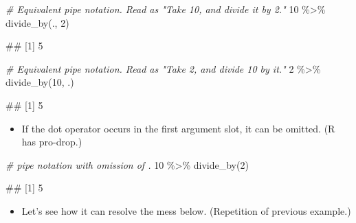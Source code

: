 \documentclass[
]{book}
\newenvironment{Shaded}{\begin{snugshade}}{\end{snugshade}}
\newcommand{\CommentTok}[1]{\textcolor[rgb]{0.56,0.35,0.01}{\textit{#1}}}
\newcommand{\DecValTok}[1]{\textcolor[rgb]{0.00,0.00,0.81}{#1}}
\newcommand{\FunctionTok}[1]{\textcolor[rgb]{0.00,0.00,0.00}{#1}}
\newcommand{\NormalTok}[1]{#1}
\newcommand{\SpecialCharTok}[1]{\textcolor[rgb]{0.00,0.00,0.00}{#1}}
\providecommand{\tightlist}{%
  \setlength{\itemsep}{0pt}\setlength{\parskip}{0pt}}
\begin{document}
\begin{Shaded}
\begin{Highlighting}[]
\CommentTok{\# Equivalent pipe notation. Read as "Take 10, and divide it by 2."}
\DecValTok{10} \SpecialCharTok{\%\textgreater{}\%} \FunctionTok{divide\_by}\NormalTok{(., }\DecValTok{2}\NormalTok{)}
\end{Highlighting}
\end{Shaded}

\begin{Shaded}
\begin{Highlighting}[]
\NormalTok{\#\# [1] 5}
\end{Highlighting}
\end{Shaded}

\begin{Shaded}
\begin{Highlighting}[]
\CommentTok{\# Equivalent pipe notation. Read as "Take 2, and divide 10 by it."}
\DecValTok{2} \SpecialCharTok{\%\textgreater{}\%} \FunctionTok{divide\_by}\NormalTok{(}\DecValTok{10}\NormalTok{, .)}
\end{Highlighting}
\end{Shaded}

\begin{Shaded}
\begin{Highlighting}[]
\NormalTok{\#\# [1] 5}
\end{Highlighting}
\end{Shaded}

\begin{itemize}
\tightlist
\item
  If the dot operator occurs in the first argument slot, it can be omitted. (R has pro-drop.)
\end{itemize}

\begin{Shaded}
\begin{Highlighting}[]
\CommentTok{\# pipe notation with omission of \textquotesingle{}.\textquotesingle{}}
\DecValTok{10} \SpecialCharTok{\%\textgreater{}\%} \FunctionTok{divide\_by}\NormalTok{(}\DecValTok{2}\NormalTok{)}
\end{Highlighting}
\end{Shaded}

\begin{Shaded}
\begin{Highlighting}[]
\NormalTok{\#\# [1] 5}
\end{Highlighting}
\end{Shaded}

\begin{itemize}
\tightlist
\item
  Let's see how it can resolve the mess below. (Repetition of previous example.)
\end{itemize}
\end{document}
